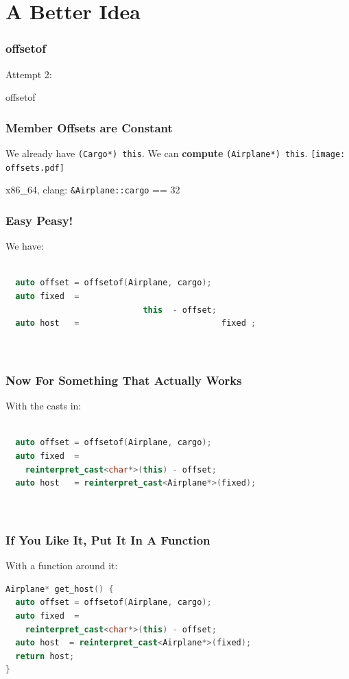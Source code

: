 \documentclass{beamer}
\def\code#1{\texttt{#1}}
\newcommand{\nl}{\vspace{0.2\baselineskip}}
\begin{document}
\section{A Better Idea}

\begin{frame}[fragile]
\frametitle{offsetof}
\begin{center}
  Attempt 2:\nl\nl

  {\Huge offsetof}
\end{center}
\end{frame}


\begin{frame}[fragile]
\frametitle{Member Offsets are Constant}
\begin{center}
  We already have \code{(Cargo*) this}. We can \textbf{compute}
  \code{(Airplane*) this}.
  \texttt{[image: offsets.pdf]}

  x86\_64, clang: \code{\&Airplane::cargo} == 32
\end{center}
\end{frame}


\begin{frame}[fragile]
\frametitle{Easy Peasy!}
\begin{center}
  We have:
\end{center}
\begin{lstlisting}[language=cpp]

  auto offset = offsetof(Airplane, cargo);
  auto fixed  =
                            this  - offset;
  auto host   =                             fixed ;
                  
 
\end{lstlisting}
\end{frame}


\begin{frame}[fragile]
\frametitle{Now For Something That Actually Works}
\begin{center}
  With the casts in:
\end{center}
\begin{lstlisting}[language=cpp]

  auto offset = offsetof(Airplane, cargo);
  auto fixed  =
    reinterpret_cast<char*>(this) - offset;
  auto host   = reinterpret_cast<Airplane*>(fixed);
                    
 
\end{lstlisting}
\end{frame}


\begin{frame}[fragile]
\frametitle{If You Like It, Put It In A Function}
\begin{center}
  With a function around it:
\end{center}
\begin{lstlisting}[language=cpp]
Airplane* get_host() {
  auto offset = offsetof(Airplane, cargo);
  auto fixed  =
    reinterpret_cast<char*>(this) - offset;
  auto host  = reinterpret_cast<Airplane*>(fixed);
  return host;
}
\end{lstlisting}
\end{frame}
\end{document}
